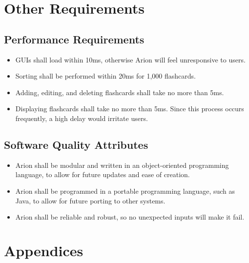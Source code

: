 \documentclass{scrreprt}
\begin{document}
\chapter{Other Requirements}

\section{Performance Requirements}
\begin{itemize}
    \item GUIs shall load within 10ms, otherwise Arion will feel unresponsive to users.
    \item Sorting shall be performed within 20ms for 1,000 flashcards.
    \item Adding, editing, and deleting flashcards shall take no more than 5ms.
    \item Displaying flashcards shall take no more than 5ms.
        Since this process occurs frequently, a high delay would irritate users.
\end{itemize}

\section{Software Quality Attributes}
\begin{itemize}
    \item Arion shall be modular and written in an object-oriented programming language,
        to allow for future updates and ease of creation.
    \item Arion shall be programmed in a portable programming language,
        such as Java, to allow for future porting to other systems.
    \item Arion shall be reliable and robust, so no unexpected inputs will
        make it fail.
\end{itemize}


\chapter{Appendices}
\end{document}
